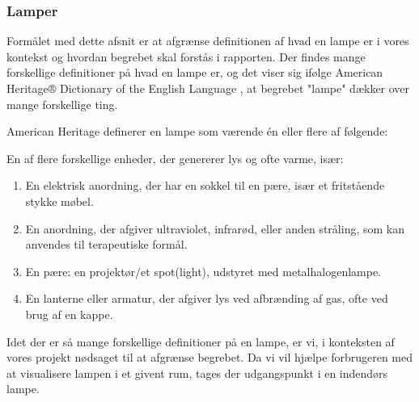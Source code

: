 

\subsubsection{Lamper}
Formålet med dette afsnit er at afgrænse definitionen af hvad en lampe er i vores kontekst og hvordan begrebet skal forstås i rapporten.
Der findes mange forskellige definitioner på hvad en lampe er, og det viser sig ifølge American Heritage® Dictionary of the English Language \cite{american_heritage}, at begrebet "lampe" dækker over mange forskellige ting. 

American Heritage definerer en lampe som værende én eller flere af følgende:

En af flere forskellige enheder, der genererer lys og ofte varme, især:
\begin{enumerate}
    \item En elektrisk anordning, der har en sokkel til en pære, især et fritstående stykke møbel.
    \item En anordning, der afgiver ultraviolet, infrarød, eller anden stråling, som kan anvendes til terapeutiske formål.
    \item En pære: en projektør/et spot(light), udstyret med metalhalogenlampe.
    \item En lanterne eller armatur, der afgiver lys ved afbrænding af gas, ofte ved brug af en kappe.
\end{enumerate}

Idet der er så mange forskellige definitioner på en lampe, er vi, i konteksten af vores projekt nødsaget til at afgrænse begrebet. Da vi vil hjælpe forbrugeren med at visualisere lampen i et givent rum, tages der udgangspunkt i en indendørs lampe.



